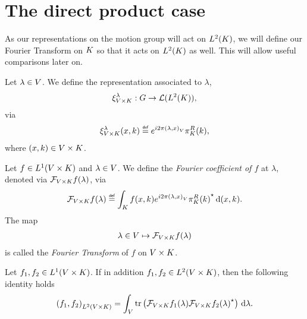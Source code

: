 \section{The direct product case}

As our representations on the motion group will act on $\Lebesgue{2}\CompactGroup$,
we will define our Fourier Transform on $\CompactGroup$ so that it acts on $\Lebesgue{2}\CompactGroup$ as well.
This will allow useful comparisons later on.

\begin{definition}
    Let $\lambda \in \VectorSpace$.
    We define the representation associated to $\lambda$,
    \begin{align*}
        \Rep [\GroupDirect] \lambda : \Group \to \Lin{\Lebesgue 2 \CompactGroup},
    \end{align*}
    via
    \begin{align*}
        \Rep [\GroupDirect] \lambda (x, k) \defeq \e^{\i \turn \ip \lambda x} \RightRegularRepresentation (k),
    \end{align*}
    where $(x, k) \in \GroupDirect$.
\end{definition}

\begin{definition}
    Let $f \in \Lebesgue 1 \GroupDirect$ and $\lambda \in \VectorSpace$.
    We define the \emph{Fourier coefficient of $f$} at $\lambda$,
    denoted via $\Fourier[\GroupDirect] f(\lambda)$, via
    \begin{align*}
        \Fourier [\GroupDirect] f(\lambda) \defeq \int_\CompactGroup f(x, k) \e^{\i \turn \ip \lambda x} \adj{\RightRegularRepresentation(k)} \dd (x, k).
    \end{align*}
    The map
    \begin{align*}
        \lambda \in \VectorSpace \mapsto \Fourier [\GroupDirect] f(\lambda)
    \end{align*}
    is called the \emph{Fourier Transform} of $f$ on $\GroupDirect$.
\end{definition}

\begin{proposition}
    Let $f_1, f_2 \in \Lebesgue 1 \GroupDirect$.
    If in addition $f_1, f_2 \in \Lebesgue 2 \GroupDirect$,
    then the following identity holds
    \begin{align*}
        \ip [\Lebesgue 2 \GroupDirect] {f_1} {f_2}
        = \int_\VectorSpace \tr\left(\Fourier [\GroupDirect] f_1(\lambda) \adj{\Fourier [\GroupDirect] f_2(\lambda)}\right) \dd \lambda.
    \end{align*}
\end{proposition}

